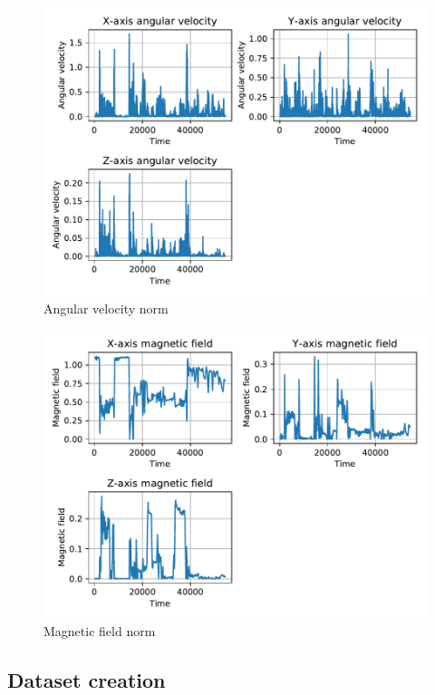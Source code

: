 \begin{figure}[htp]
\includegraphics[scale=0.55]{angular_velocity_susanna.pdf}
\caption{Angular velocity norm}
\label{fig:gyr}
\end{figure}

\begin{figure}[htp]
\includegraphics[scale=0.55]{magnetic_field_susanna.pdf}
\caption{Magnetic field norm}
\label{fig:mag}
\end{figure}


\subsection{Dataset creation}


